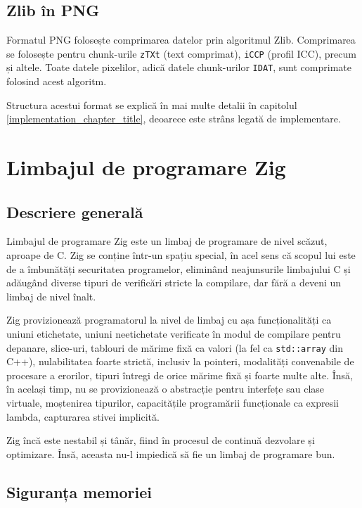 \documentclass[a4paper,12pt]{report}
\begin{document}
\subsection{Zlib în \acs{PNG}}

Formatul \ac{PNG} folosește comprimarea datelor prin algoritmul Zlib.
Comprimarea se folosește pentru chunk-urile \texttt{zTXt} (text comprimat),
\texttt{iCCP} (profil \ac{ICC}), precum și altele.
Toate datele pixelilor, adică datele chunk-urilor \texttt{IDAT}, sunt comprimate folosind acest algoritm.

Structura acestui format se explică în mai multe detalii în capitolul \ref{implementation_chapter_title},
deoarece este strâns legată de implementare.

\section{Limbajul de programare Zig}

\subsection{Descriere generală}

Limbajul de programare Zig este un limbaj de programare de nivel scăzut, aproape de C.
Zig se conține într-un spațiu special, în acel sens că scopul lui este de
a îmbunătăți securitatea programelor, eliminând neajunsurile limbajului C
și adăugând diverse tipuri de verificări stricte la compilare,
dar fără a deveni un limbaj de nivel înalt.

Zig provizionează programatorul la nivel de limbaj cu așa funcționalități ca 
uniuni etichetate, uniuni neetichetate verificate în modul de compilare pentru depanare,
slice-uri, tablouri de mărime fixă ca valori (la fel ca \texttt{std::array} din C++),
nulabilitatea foarte strictă, inclusiv la pointeri, modalități convenabile de procesare a erorilor,
tipuri întregi de orice mărime fixă și foarte multe alte.
Însă, în același timp, nu se provizionează o abstracție pentru interfețe sau clase virtuale,
moștenirea tipurilor, capacitățile programării funcționale ca expresii lambda,
capturarea stivei implicită.

Zig încă este nestabil și tânăr, fiind în procesul de continuă dezvolare și optimizare.
Însă, aceasta nu-l impiedică să fie un limbaj de programare bun.

\subsection{Siguranța memoriei}
\end{document}
